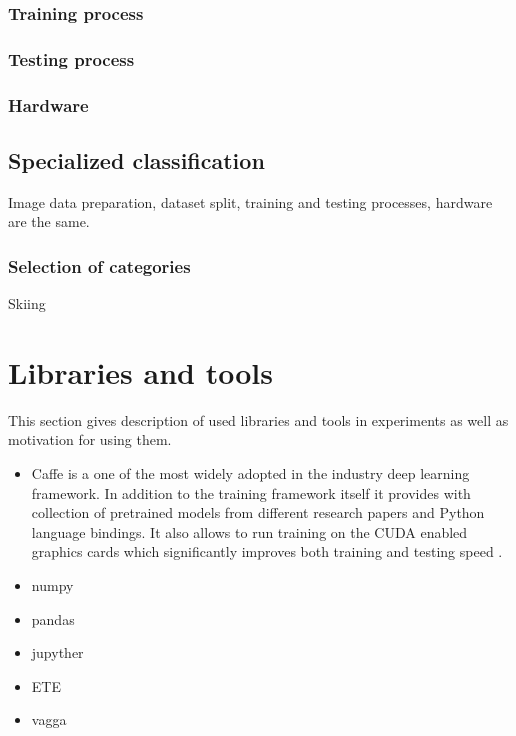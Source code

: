     \subsubsection{Training process}
    \subsubsection{Testing process}
    \subsubsection{Hardware}

\subsection{Specialized classification}
Image data preparation, dataset split, training and testing processes, hardware are the same.
    \subsubsection{Selection of categories}
    Skiing
    
\section{Libraries and tools}
This section gives description of used libraries and tools in experiments as well as motivation for using them.

\begin{itemize}
    \item Caffe \cite{Jia2014Caffe} is a one of the most widely adopted in the industry deep learning framework. In addition to the training framework itself it provides with collection of pretrained models from different research papers \cite{BerkeleyVisionandLearningCenterCaffeZoo} and Python language bindings. It also allows to run training on the CUDA \cite{NVIDIAParallelNVIDIA} enabled graphics cards which significantly improves both training and testing speed \cite{Krizhevsky2012ImageNetNetworks}.
    \item numpy
    \item pandas
    \item jupyther
    \item ETE
    \item vagga
\end{itemize}
